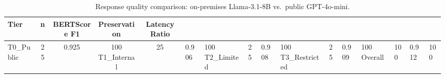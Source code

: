 \begin{table}[t]
\centering
\caption{Response quality comparison: on-premises Llama-3.1-8B vs.\ public GPT-4o-mini.}
\label{tab:quality}
\begin{tabular}{lcccc}
\toprule
\textbf{Tier} & \textbf{n} & \textbf{BERTScore F1} & \textbf{Preservation} & \textbf{Latency Ratio} \\
\midrule
T0_Public & 25 & 0.925 & 100%
T1_Internal & 25 & 0.906 & 100%
T2_Limited & 25 & 0.908 & 100%
T3_Restricted & 25 & 0.909 & 100%
\midrule
Overall & 100 & 0.912 & 100%
\bottomrule
\end{tabular}
\end{table}
